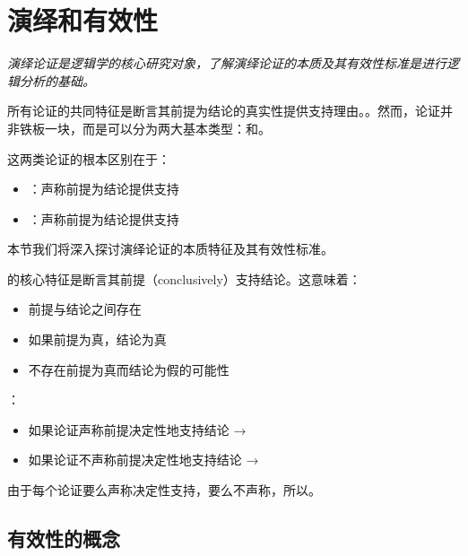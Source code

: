\section{演绎和有效性}

\begin{logicbox}[title=引言]
\textit{演绎论证是逻辑学的核心研究对象，了解演绎论证的本质及其有效性标准是进行逻辑分析的基础。}
\end{logicbox}

所有论证的共同特征是断言其前提为结论的真实性提供支持理由。。然而，论证并非铁板一块，而是可以分为两大基本类型：和。

这两类论证的根本区别在于：
\begin{itemize}
  \item {}：声称前提为结论提供支持
  \item {}：声称前提为结论提供支持
\end{itemize}

本节我们将深入探讨演绎论证的本质特征及其有效性标准。

\begin{theorembox}[title=演绎论证的识别标准]
的核心特征是断言其前提（conclusively）支持结论。这意味着：
\begin{itemize}
  \item 前提与结论之间存在
  \item 如果前提为真，结论为真
  \item 不存在前提为真而结论为假的可能性
\end{itemize}

：
\begin{itemize}
  \item 如果论证声称前提决定性地支持结论 → 
  \item 如果论证不声称前提决定性地支持结论 → 
\end{itemize}

由于每个论证要么声称决定性支持，要么不声称，所以。
\end{theorembox}

\subsection{有效性的概念}

